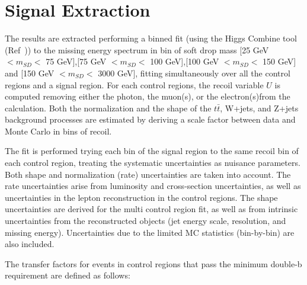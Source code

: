 \clearpage
\section{Signal Extraction}
\label{sec:fitdesc}
The results are extracted performing a binned fit (using the Higgs Combine tool (Ref~\cite{COMBINE})) to the missing energy spectrum in bin of soft drop mass [25 GeV $< m_{SD} <$ 75 GeV],[75 GeV $< m_{SD} <$ 100 GeV],[100 GeV $< m_{SD} <$ 150 GeV] and [150 GeV $< m_{SD} <$ 3000 GeV], fitting simultaneously over all the control regions and a signal region.
For each control regions, the recoil variable $U$ is computed removing either the photon, the muon(s), or the electron(s)from the \MET calculation. Both the normalization and the shape of the $t\bar{t}$, W+jets, and Z+jets background processes are estimated by deriving a scale factor between data and Monte Carlo in bins of recoil. 

The fit is performed trying each \MET bin of the signal region to the same recoil bin of each control region, treating the systematic uncertainties as nuisance parameters. 
Both shape and normalization (rate) uncertainties are taken into account. The rate uncertainties arise from luminosity and cross-section uncertainties, as well as uncertainties in the lepton reconstruction in the control regions. The shape uncertainties are derived for the multi control region fit, as well as from intrinsic uncertainties from the reconstructed objects (jet energy scale, resolution, and missing energy). Uncertainties due to the limited MC statistics (bin-by-bin) are also included.


The transfer factors for events in control regions that pass the minimum double-b requirement are defined as follows:

